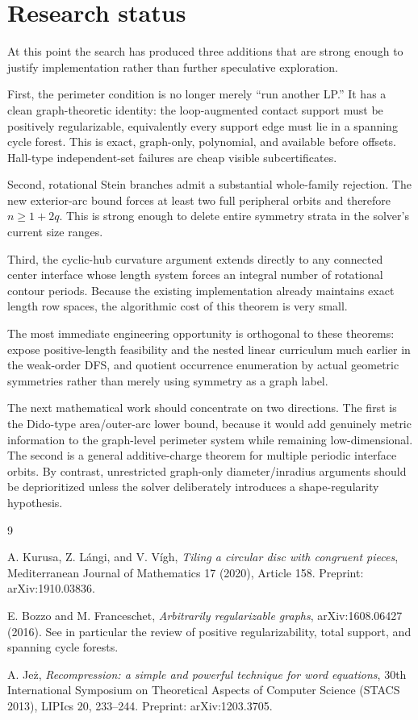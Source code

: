 \documentclass[11pt]{article}
\theoremstyle{definition}
\theoremstyle{remark}
\begin{document}
\section{Research status}

At this point the search has produced three additions that are strong enough to justify implementation rather than further speculative exploration.

First, the perimeter condition is no longer merely ``run another LP.''  It has a clean graph-theoretic identity: the loop-augmented contact support must be positively regularizable, equivalently every support edge must lie in a spanning cycle forest.  This is exact, graph-only, polynomial, and available before offsets.  Hall-type independent-set failures are cheap visible subcertificates.

Second, rotational Stein branches admit a substantial whole-family rejection.  The new exterior-arc bound forces at least two full peripheral orbits and therefore $n\ge1+2q$.  This is strong enough to delete entire symmetry strata in the solver's current size ranges.

Third, the cyclic-hub curvature argument extends directly to any connected center interface whose length system forces an integral number of rotational contour periods.  Because the existing implementation already maintains exact length row spaces, the algorithmic cost of this theorem is very small.

The most immediate engineering opportunity is orthogonal to these theorems: expose positive-length feasibility and the nested linear curriculum much earlier in the weak-order DFS, and quotient occurrence enumeration by actual geometric symmetries rather than merely using symmetry as a graph label.

The next mathematical work should concentrate on two directions.  The first is the Dido-type area/outer-arc lower bound, because it would add genuinely metric information to the graph-level perimeter system while remaining low-dimensional.  The second is a general additive-charge theorem for multiple periodic interface orbits.  By contrast, unrestricted graph-only diameter/inradius arguments should be deprioritized unless the solver deliberately introduces a shape-regularity hypothesis.

\begin{thebibliography}{9}

A. Kurusa, Z. L\'angi, and V. V\'igh,
\emph{Tiling a circular disc with congruent pieces},
Mediterranean Journal of Mathematics 17 (2020), Article 158.
Preprint: arXiv:1910.03836.

E. Bozzo and M. Franceschet,
\emph{Arbitrarily regularizable graphs},
arXiv:1608.06427 (2016).
See in particular the review of positive regularizability, total support, and spanning cycle forests.

A. Je\.{z},
\emph{Recompression: a simple and powerful technique for word equations},
30th International Symposium on Theoretical Aspects of Computer Science (STACS 2013),
LIPIcs 20, 233--244.
Preprint: arXiv:1203.3705.

\end{thebibliography}
\end{document}
